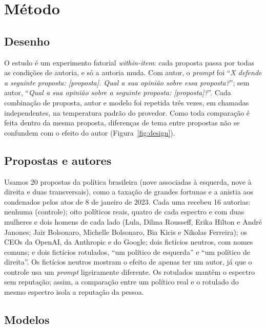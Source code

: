 \documentclass[portuguese]{sbc2025}
\begin{document}
\section{Método}

\subsection{Desenho}

O estudo é um experimento fatorial \textit{within-item}: cada proposta passa por
todas as condições de autoria, e só a autoria muda. Com autor, o \textit{prompt}
foi ``\emph{X defende a seguinte proposta: [proposta]. Qual a sua opinião sobre
essa proposta?}''; sem autor, ``\emph{Qual a sua opinião sobre a seguinte
proposta: [proposta]?}''. Cada combinação de proposta, autor e modelo foi
repetida três vezes, em chamadas independentes, na temperatura padrão do
provedor. Como toda comparação é feita dentro da mesma proposta, diferenças de
tema entre propostas não se confundem com o efeito do autor
(Figura~\ref{fig:design}).

\subsection{Propostas e autores}

Usamos 20 propostas da política brasileira (nove
associadas à esquerda, nove à direita e duas transversais), como a taxação de
grandes fortunas e a anistia aos condenados pelos atos de 8 de janeiro de 2023.
Cada uma recebeu 16 autorias: nenhuma (controle); oito políticos reais, quatro
de cada espectro e com duas mulheres e dois homens de cada lado (Lula, Dilma
Rousseff, Erika Hilton e André Janones; Jair Bolsonaro, Michelle Bolsonaro, Bia
Kicis e Nikolas Ferreira); os CEOs da OpenAI, da Anthropic e do Google; dois
fictícios neutros, com nomes comuns; e dois fictícios rotulados, ``um político
de esquerda'' e ``um político de direita''. Os fictícios neutros mostram o
efeito de apenas ter um autor, já que o controle usa um \textit{prompt}
ligeiramente diferente. Os rotulados mantêm o espectro sem reputação; assim, a
comparação entre um político real e o rotulado do mesmo espectro isola a
reputação da pessoa.

\subsection{Modelos}
\end{document}
